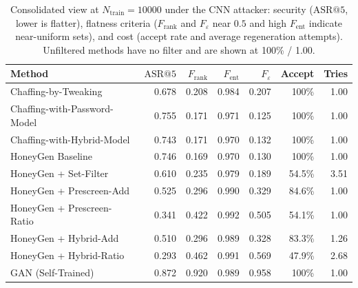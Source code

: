\begin{table}[t]
  \centering\small
  \begin{tabular}{lrrrrrr}
    \toprule
    \textbf{Method} & $\mathrm{ASR}@5$ & $F_{\text{rank}}$ & $F_{\text{ent}}$
      & $F_{\varepsilon}$ & Accept & Tries \\
    \midrule
    Chaffing-by-Tweaking & 0.678 & 0.208 & 0.984 & 0.207 & 100\% & 1.00 \\
    Chaffing-with-Password-Model & 0.755 & 0.171 & 0.971 & 0.125 & 100\% & 1.00 \\
    Chaffing-with-Hybrid-Model & 0.743 & 0.171 & 0.970 & 0.132 & 100\% & 1.00 \\
    HoneyGen Baseline & 0.746 & 0.169 & 0.970 & 0.130 & 100\% & 1.00 \\
    \addlinespace
    HoneyGen + Set-Filter & 0.610 & 0.235 & 0.979 & 0.189 & 54.5\% & 3.51 \\
    HoneyGen + Prescreen-Add & 0.525 & 0.296 & 0.990 & 0.329 & 84.6\% & 1.00 \\
    HoneyGen + Prescreen-Ratio & 0.341 & 0.422 & 0.992 & 0.505 & 54.1\% & 1.00 \\
    HoneyGen + Hybrid-Add & 0.510 & 0.296 & 0.989 & 0.328 & 83.3\% & 1.26 \\
    HoneyGen + Hybrid-Ratio & 0.293 & 0.462 & 0.991 & 0.569 & 47.9\% & 2.68 \\
        GAN (Self-Trained) & 0.872 & 0.920 & 0.989 & 0.958 & 100\% & 1.00 \\
    \bottomrule
  \end{tabular}
  \caption{Consolidated view at $N_{\text{train}}=10000$ under the CNN
  attacker: security ($\mathrm{ASR}@5$, lower is flatter), flatness
  criteria ($F_{\text{rank}}$ and $F_{\varepsilon}$ near $0.5$ and high
  $F_{\text{ent}}$ indicate near-uniform sets), and cost (accept rate and
  average regeneration attempts). Unfiltered methods have no filter and are
  shown at 100\% / 1.00.}
  \label{tab:summary2000}
\end{table}

